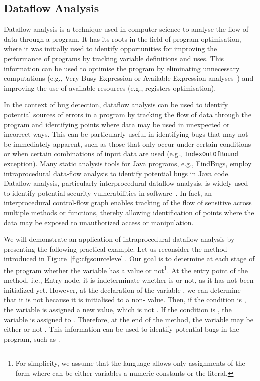 \subsection{Dataflow Analysis}%
\label{sec:dataflowanalysis}
Dataflow analysis is a technique used in computer science to analyse the flow of
data through a program. It has its roots in the field of program optimisation,
where it was initially used to identify opportunities for improving the performance
of programs by tracking variable definitions and uses. This information can be used to optimise the program by eliminating
unnecessary computations (e.g., Very Busy Expression or Available Expression
analyses~\cite{aho2007compilers}) and improving
the use of available resources (e.g., registers optimisation).


In the context of bug detection, dataflow analysis can be used to identify
potential sources of errors in a program by tracking the flow of data through
the program and identifying points where data may be used in unexpected or
incorrect ways. This can be particularly useful in identifying bugs that may
not be immediately apparent, such as those that only occur under certain
conditions or when certain combinations of input data are used (e.g., \texttt{IndexOutOfBound} exception).
Many static analysis tools for Java programs, e.g., FindBugs, employ intraprocedural
data-flow analysis to identify potential bugs in Java code.
Dataflow analysis, particularly interprocedural dataflow analysis, is widely
used to identify potential security vulnerabilities in software~\cite{flowDroid}. 
In fact, an interprocedural control-flow graph enables tracking of the flow of 
sensitive across multiple methods or functions, thereby allowing identification of points
where the data may be exposed to unauthorized access or manipulation.

We will demonstrate an application of intraprocedural dataflow analysis by presenting the following
practical example. Let us reconsider the  method introduced in Figure~\ref{fig:cfgsourcelevel}.
Our goal is to determine at each stage of the program whether the variable 
has a  value or not\footnote{For simplicity, we assume that the language
allows only assignments of the form  where  can
be either variables a numeric constants or the  literal.}.
 At the entry point of the method, i.e., Entry node,
it is indeterminate whether  is  or not, as it has not been initialized yet.
However, at the declaration of the variable , we can determine that it is
not  because it is initialised to a non-
value. Then, if the condition  is , the
variable  is assigned a new value, which is not . If the condition
is , the variable  is assigned to . Therefore, at the
end of the method, the variable  may be either  or not .
This information can be used to identify potential bugs in the program, such as
.


